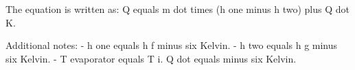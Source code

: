 The equation is written as:  
Q equals m dot times (h one minus h two) plus Q dot K.  

Additional notes:  
- h one equals h f minus six Kelvin.  
- h two equals h g minus six Kelvin.  
- T evaporator equals T i. Q dot equals minus six Kelvin.